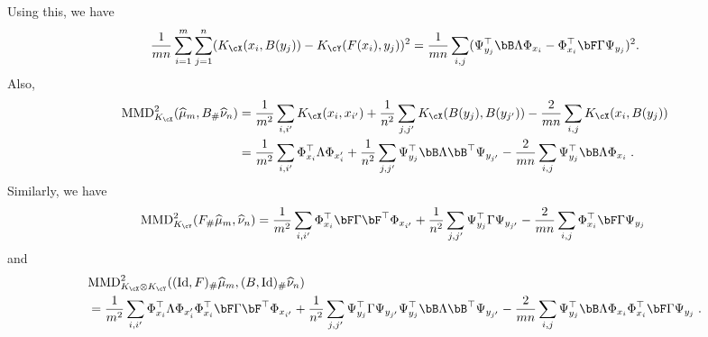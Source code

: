\documentclass[11pt]{article}
\begin{document}
Using this, we have
\begin{equation}
	\label{eqn:rgm}
	\frac{1}{m n} \sum_{i = 1}^{m} \sum_{j = 1}^{n} (K_{\cX}(x_i, B(y_j)) - K_{\cY}(F(x_i), y_j))^2 = \frac{1}{mn} \sum_{i, j} (\Psi_{y_j}^\top \bB \Lambda \Phi_{x_i} - \Phi_{x_i}^\top \bF \Gamma \Psi_{y_j})^2.
\end{equation}
Also, 
\begin{equation} 
	\label{eqn:mmd-x}
	\begin{split}
		\mathrm{MMD}_{K_{\cX}}^2(\widehat{\mu}_m, B_{\#} \widehat{\nu}_n) 
		& = 
		\frac{1}{m^2} \sum_{i, i'} K_{\cX}(x_i, x_{i'})	+ \frac{1}{n^2} \sum_{j, j'} K_{\cX}(B(y_j), B(y_{j'}))	- \frac{2}{mn} \sum_{i, j} K_{\cX}(x_i, B(y_j)) \\
		& = \frac{1}{m^2} \sum_{i, i'} \Phi_{x_i}^\top \Lambda \Phi_{x_i'} + \frac{1}{n^2} \sum_{j, j'} \Psi_{y_j}^\top \bB \Lambda \bB^\top \Psi_{y_{j'}} - \frac{2}{m n} \sum_{i, j} \Psi_{y_j}^\top \bB \Lambda \Phi_{x_i} \;.
	\end{split}
\end{equation}
Similarly, we have
\begin{equation}
	\label{eqn:mmd-y}
	\mathrm{MMD}_{K_{\cY}}^2(F_{\#} \widehat{\mu}_m, \widehat{\nu}_n) 
	= 
	\frac{1}{m^2} \sum_{i, i'} \Phi_{x_i}^\top \bF \Gamma \bF^\top \Phi_{x_{i'}} + \frac{1}{n^2} \sum_{j, j'} \Psi_{y_j}^\top \Gamma \Psi_{y_{j'}} - \frac{2}{m n} \sum_{i, j} \Phi_{x_i}^\top \bF \Gamma \Psi_{y_j} \;
\end{equation}
and 
\begin{equation}
	\label{eqn:mmd-xy}
	\begin{split}
		& \mathrm{MMD}_{K_{\cX} \otimes K_{\cY}}^2((\mathrm{Id}, F)_{\#} \widehat{\mu}_m, (B, \mathrm{Id})_{\#} \widehat{\nu}_n) \\
		& = \frac{1}{m^2} \sum_{i, i'} \Phi_{x_i}^\top \Lambda \Phi_{x_i'} \Phi_{x_i}^\top \bF \Gamma \bF^\top \Phi_{x_{i'}} + \frac{1}{n^2} \sum_{j, j'} \Psi_{y_j}^\top \Gamma \Psi_{y_{j'}} \Psi_{y_j}^\top \bB \Lambda \bB^\top \Psi_{y_{j'}} - \frac{2}{m n} \sum_{i, j} \Psi_{y_j}^\top \bB \Lambda \Phi_{x_i} \Phi_{x_i}^\top \bF \Gamma \Psi_{y_j} \;.
	\end{split}
\end{equation}
\end{document}
